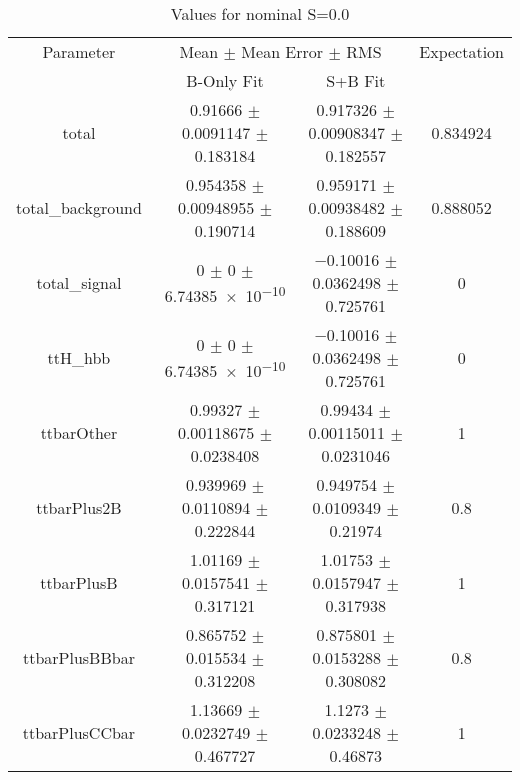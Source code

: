 \begin{table}
\centering
\caption{Values for nominal S=0.0}
\begin{tabular}{cccc}
\toprule
Parameter & \multicolumn{2}{c}{Mean $\pm$ Mean Error $\pm$ RMS} & Expectation\\
 & B-Only Fit & S+B Fit & \\
\midrule
total & \num{0.91666} $\pm$ \num{0.0091147} $\pm$ \num{0.183184} & \num{0.917326} $\pm$ \num{0.00908347} $\pm$ \num{0.182557} & \num{0.834924}\\
total\_background & \num{0.954358} $\pm$ \num{0.00948955} $\pm$ \num{0.190714} & \num{0.959171} $\pm$ \num{0.00938482} $\pm$ \num{0.188609} & \num{0.888052}\\
total\_signal & \num{0} $\pm$ \num{0} $\pm$ \num{6.74385e-10} & \num{-0.10016} $\pm$ \num{0.0362498} $\pm$ \num{0.725761} & \num{0}\\
ttH\_hbb & \num{0} $\pm$ \num{0} $\pm$ \num{6.74385e-10} & \num{-0.10016} $\pm$ \num{0.0362498} $\pm$ \num{0.725761} & \num{0}\\
ttbarOther & \num{0.99327} $\pm$ \num{0.00118675} $\pm$ \num{0.0238408} & \num{0.99434} $\pm$ \num{0.00115011} $\pm$ \num{0.0231046} & \num{1}\\
ttbarPlus2B & \num{0.939969} $\pm$ \num{0.0110894} $\pm$ \num{0.222844} & \num{0.949754} $\pm$ \num{0.0109349} $\pm$ \num{0.21974} & \num{0.8}\\
ttbarPlusB & \num{1.01169} $\pm$ \num{0.0157541} $\pm$ \num{0.317121} & \num{1.01753} $\pm$ \num{0.0157947} $\pm$ \num{0.317938} & \num{1}\\
ttbarPlusBBbar & \num{0.865752} $\pm$ \num{0.015534} $\pm$ \num{0.312208} & \num{0.875801} $\pm$ \num{0.0153288} $\pm$ \num{0.308082} & \num{0.8}\\
ttbarPlusCCbar & \num{1.13669} $\pm$ \num{0.0232749} $\pm$ \num{0.467727} & \num{1.1273} $\pm$ \num{0.0233248} $\pm$ \num{0.46873} & \num{1}\\
\bottomrule
\end{tabular}
\end{table}